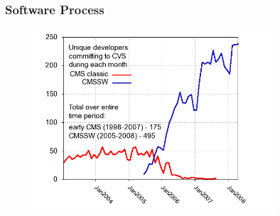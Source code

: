 \begin{frame}
\frametitle{Software Process}

\begin{figure}[htbp]
\begin{center}
\includegraphics[width=0.8\textwidth]{images/cmssw_dev_per_month.png}
\end{center}
\end{figure}

\end{frame}


